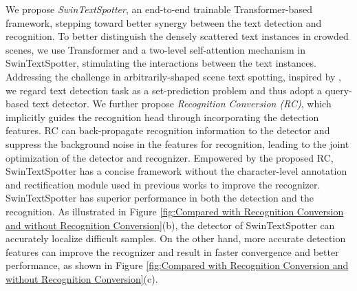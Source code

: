 \documentclass[10pt,twocolumn,letterpaper]{article}
\begin{document}
We propose \textit{SwinTextSpotter}, an end-to-end trainable Transformer-based framework, stepping toward better synergy between the text detection and recognition.
To better distinguish the densely scattered text instances in crowded scenes, we use Transformer and a two-level self-attention mechanism in SwinTextSpotter, stimulating the interactions between the text instances.
Addressing the challenge in arbitrarily-shaped scene text spotting, inspired by \cite{sun2021sparse,hu2021istr}, we regard text detection task as a set-prediction problem and thus adopt a query-based text detector.
We further propose \textit{Recognition Conversion (RC)}, which implicitly guides the recognition head through incorporating the detection features.
RC can back-propagate recognition information to the detector and suppress the background noise in the features for recognition, leading to the joint optimization of the detector and recognizer.
Empowered by the proposed RC, SwinTextSpotter has a concise framework without the character-level annotation and rectification module used in previous works to improve the recognizer.
SwinTextSpotter has superior performance in both the detection and the recognition.
As illustrated in Figure \ref{fig:Compared with Recognition Conversion and without Recognition Conversion}(b), the detector of SwinTextSpotter can accurately localize difficult samples.
On the other hand, more accurate detection features can improve the recognizer and result in faster convergence and better performance, as shown in Figure \ref{fig:Compared with Recognition Conversion and without Recognition Conversion}(c).
\end{document}
